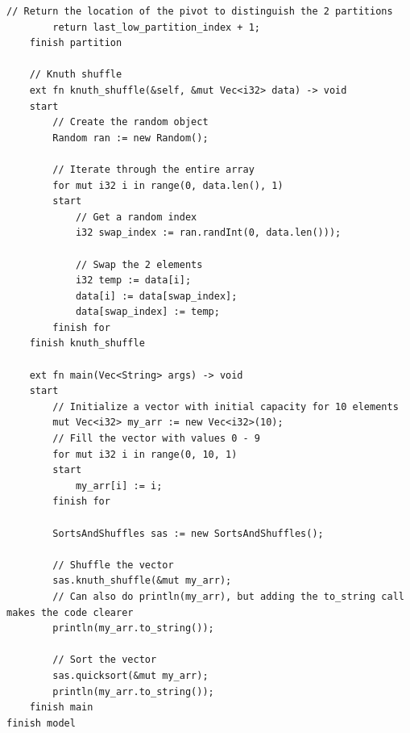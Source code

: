 \documentclass[letterpaper, 10pt, DIV=13]{scrartcl}
\numberwithin{equation}{section}
\numberwithin{figure}{section}
\numberwithin{table}{section}
\begin{document}
\begin{lstlisting}[caption = SortsAndShuffles.rez, frame = single, nolol]
        // Return the location of the pivot to distinguish the 2 partitions
        return last_low_partition_index + 1;
    finish partition

    // Knuth shuffle
    ext fn knuth_shuffle(&self, &mut Vec<i32> data) -> void
    start
        // Create the random object
        Random ran := new Random();

        // Iterate through the entire array
        for mut i32 i in range(0, data.len(), 1)
        start
            // Get a random index
            i32 swap_index := ran.randInt(0, data.len()));

            // Swap the 2 elements
            i32 temp := data[i];
            data[i] := data[swap_index];
            data[swap_index] := temp;
        finish for
    finish knuth_shuffle

    ext fn main(Vec<String> args) -> void
    start
        // Initialize a vector with initial capacity for 10 elements
        mut Vec<i32> my_arr := new Vec<i32>(10);
        // Fill the vector with values 0 - 9
        for mut i32 i in range(0, 10, 1)
        start
            my_arr[i] := i;
        finish for
        
        SortsAndShuffles sas := new SortsAndShuffles();

        // Shuffle the vector
        sas.knuth_shuffle(&mut my_arr);
        // Can also do println(my_arr), but adding the to_string call makes the code clearer
        println(my_arr.to_string());

        // Sort the vector
        sas.quicksort(&mut my_arr);
        println(my_arr.to_string());
    finish main
finish model
\end{lstlisting}
\end{document}
